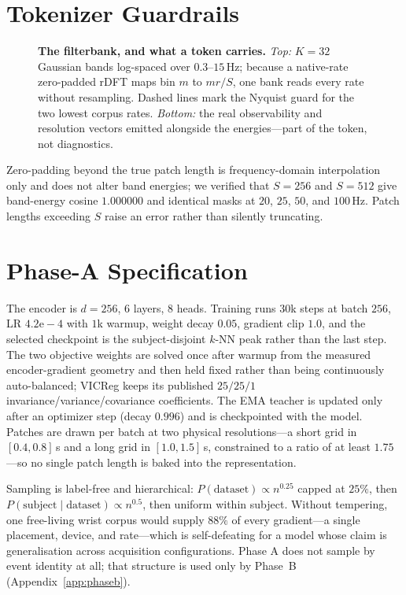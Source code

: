 \section{Tokenizer Guardrails}
\label{app:tokenizer}

\begin{figure}[h]
    \centering
    \setlength{\abovecaptionskip}{4pt}
  
  \caption{\textbf{The filterbank, and what a token carries.} \emph{Top:} $K{=}32$ Gaussian bands
  log-spaced over $0.3$--$15$\,Hz; because a native-rate zero-padded rDFT maps bin $m$ to $mr/S$,
  one bank reads every rate without resampling. Dashed lines mark the Nyquist guard for the two
  lowest corpus rates. \emph{Bottom:} the real observability and resolution vectors emitted
  alongside the energies---part of the token, not diagnostics.}
  \label{fig:tokenizer}
\end{figure}

Zero-padding beyond the true patch length is frequency-domain interpolation only and does not
alter band energies; we verified that $S{=}256$ and $S{=}512$ give band-energy cosine $1.000000$
and identical masks at $20$, $25$, $50$, and $100$\,Hz. Patch lengths exceeding $S$ raise an error
rather than silently truncating.

\section{Phase-A Specification}
\label{app:phasea}

The encoder is $d{=}256$, 6 layers, 8 heads. Training runs $30$k steps at batch $256$, LR
$4.2\mathrm{e}{-}4$ with $1$k warmup, weight decay $0.05$, gradient clip $1.0$, and the selected
checkpoint is the subject-disjoint $k$-NN peak rather than the last step. The two objective weights
are solved once after warmup from the measured encoder-gradient geometry and then held fixed rather
than being continuously auto-balanced;
VICReg keeps its published $25/25/1$ invariance/variance/covariance coefficients. The EMA teacher
is updated only after an optimizer step (decay $0.996$) and is checkpointed with the model.
Patches are drawn per batch at two physical resolutions---a short grid in $[0.4,0.8]$\,s and a
long grid in $[1.0,1.5]$\,s, constrained to a ratio of at least $1.75$---so no single patch length
is baked into the representation.

Sampling is label-free and hierarchical: $P(\text{dataset})\!\propto\!n^{0.25}$ capped at $25\%$,
then $P(\text{subject}\mid\text{dataset})\!\propto\!n^{0.5}$, then uniform within subject. Without
tempering, one free-living wrist corpus would supply $88\%$ of every gradient---a single placement,
device, and rate---which is self-defeating for a model whose claim is generalisation across
acquisition configurations. Phase A does not sample by event identity at all; that structure is
used only by Phase~B (Appendix~\ref{app:phaseb}).

